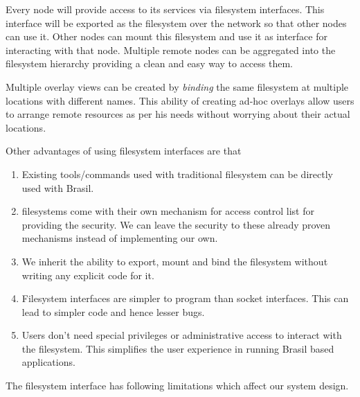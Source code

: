 \documentclass[conference]{sig-alternate}
\begin{document}
Every node will provide access to its services via filesystem interfaces.
This interface will be exported as the filesystem over the network so that other
nodes can use it. Other nodes can mount this filesystem and use it as
interface for interacting with that node.  Multiple remote nodes can be
aggregated into the filesystem hierarchy providing a clean and easy way to
access them.

Multiple overlay views can be created by \textit{binding} the same filesystem
at multiple locations with different names.  This ability of creating ad-hoc
overlays allow users to arrange remote resources as per his needs without
worrying about their actual locations.

Other advantages of using filesystem interfaces are that 
\begin{enumerate}
\item Existing tools/commands used with traditional filesystem can be directly
used with Brasil.

\item filesystems come with their own mechanism for access control list for
providing the security.  We can leave the security to these already proven 
mechanisms instead of implementing our own.

\item We inherit the ability to export, mount and bind the filesystem
without writing any explicit code for it.

\item Filesystem interfaces are simpler to program than socket interfaces.  This
can lead to simpler code and hence lesser bugs.

\item Users don't need special privileges or administrative access to interact
with the filesystem.  This simplifies the user experience in running Brasil based
applications.
\end{enumerate}

The filesystem interface has following limitations which affect our system
design.
\end{document}
